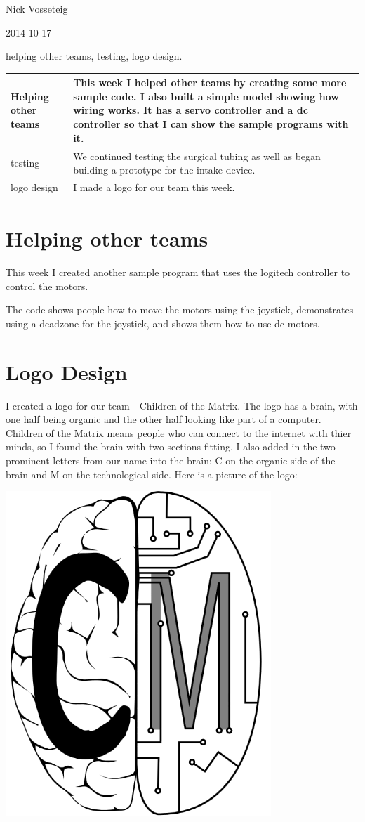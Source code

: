 Nick Vosseteig

2014-10-17

helping other teams, testing, logo design.

\begin{tabular}{|p{5cm}|p{5cm}|}
 \hline
 Helping other teams&
This week I helped other teams by creating some more sample code. I also built a simple model showing how wiring works. It has a servo controller and a dc controller so that I can show the sample programs with it. 
 \\
 \hline
testing&
We continued testing the surgical tubing as well as began building a prototype for the intake device.
 \\
 \hline
 logo design&
I made a logo for our team this week.
 \\
 \hline
\end{tabular}

\section*{Helping other teams}
This week I created another sample program that uses the logitech controller to control the motors.



The code shows people how to move the motors using the joystick, demonstrates using a deadzone for the joystick, and shows them how to use dc motors.

\section*{Logo Design}
I created a logo for our team - Children of the Matrix. The logo has a brain, with one half being organic and the other half looking like part of a computer. Children of the Matrix means people who can connect to the internet with thier minds, so I found the brain with two sections fitting. I also added in the two prominent letters from our name into the brain: C on the organic side of the brain and M on the technological side.
Here is a picture of the logo:


\begin{center}
 \includegraphics[width=10cm]{./Entries/Images/logo.png}
\end{center}
